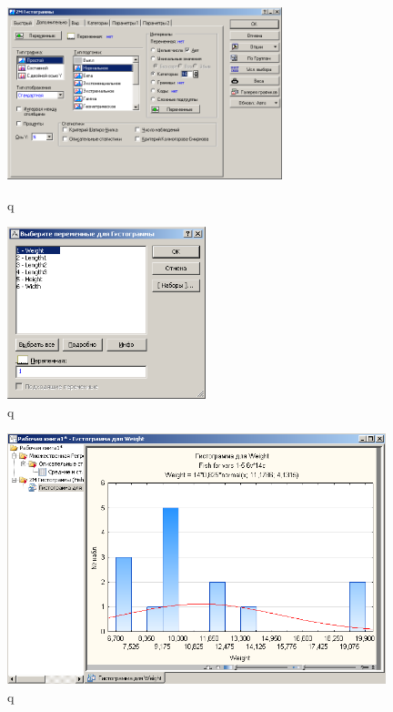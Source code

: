 \begin{figure}[!h]
  \centering
  \begin{minipage}{0.49\textwidth}
    \centering

    \includegraphics[height=5cm]
    {inc/var5__8.PNG}

    \caption{q}
    \label{fig:var5__8}
  \end{minipage}
  \begin{minipage}{0.49\textwidth}
    \centering

    \includegraphics[height=5cm]
    {inc/var5__9.PNG}

    \caption{q}
    \label{fig:var5__9}
  \end{minipage}
\end{figure}

\begin{figure}[!h]
  \centering

  \includegraphics[width=11cm]
  {inc/var5__10.PNG}

  \caption{q}

  \label{fig:var5__10}
\end{figure}

